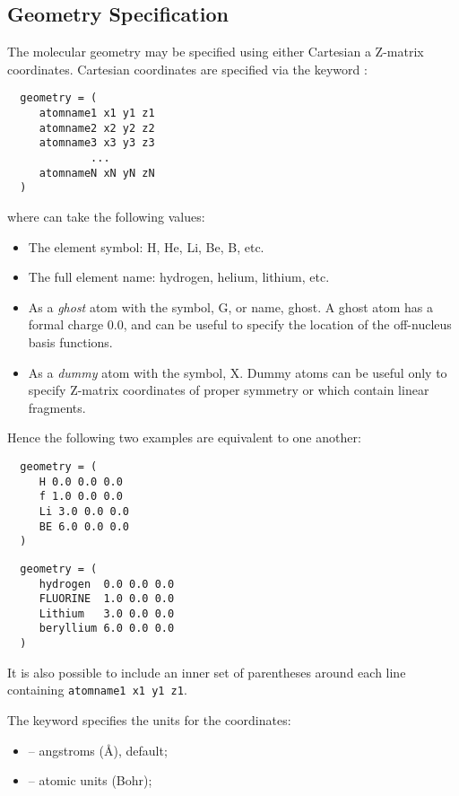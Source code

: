 \subsection{Geometry Specification} \label{geom-spec}
The molecular geometry may be specified using either Cartesian a
Z-matrix coordinates.  Cartesian coordinates are specified via the
keyword :
\begin{verbatim}
  geometry = (
     atomname1 x1 y1 z1 
     atomname2 x2 y2 z2 
     atomname3 x3 y3 z3 
             ...
     atomnameN xN yN zN 
  )
\end{verbatim}
where  can take the following values:
\begin{itemize}
\item The element symbol: H, He, Li, Be, B, etc.
\item The full element name: hydrogen, helium, lithium, etc.
\item As a {\em ghost} atom with the symbol, G, or name, ghost. A
ghost atom has a formal charge 0.0, and can be useful to specify the
location of the off-nucleus basis functions.
\item As a {\em dummy} atom with the symbol, X.  Dummy atoms can be
useful only to specify Z-matrix coordinates of proper symmetry or
which contain linear fragments.
\end{itemize}
Hence the following two examples are equivalent to one another:
\begin{verbatim}
  geometry = (
     H 0.0 0.0 0.0 
     f 1.0 0.0 0.0 
     Li 3.0 0.0 0.0 
     BE 6.0 0.0 0.0 
  )
\end{verbatim}
\begin{verbatim}
  geometry = (
     hydrogen  0.0 0.0 0.0 
     FLUORINE  1.0 0.0 0.0 
     Lithium   3.0 0.0 0.0 
     beryllium 6.0 0.0 0.0 
  )
\end{verbatim}
It is also possible to include an inner set 
of parentheses around each line containing {\tt atomname1 x1 y1 z1}.

The keyword  specifies the units for the coordinates:
\begin{itemize}
\item {} -- angstroms (\AA), default;
\item {} -- atomic units (Bohr);
\end{itemize}

